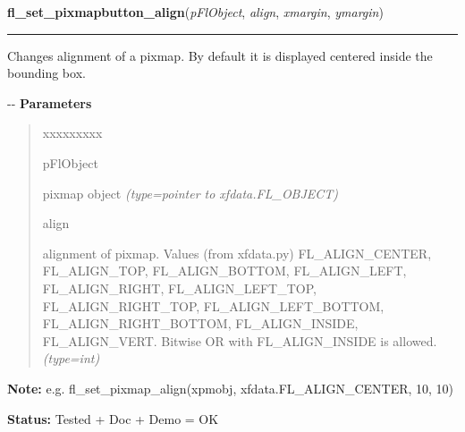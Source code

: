 \hspace{.8\funcindent}\begin{boxedminipage}{\funcwidth}

    \raggedright \textbf{fl\_set\_pixmapbutton\_align}(\textit{pFlObject}, \textit{align}, \textit{xmargin}, \textit{ymargin})

    \vspace{-1.5ex}

    \rule{\textwidth}{0.5\fboxrule}
\setlength{\parskip}{2ex}

Changes alignment of a pixmap. By default it is displayed centered
inside the bounding box.

-{}-
\setlength{\parskip}{1ex}
      \textbf{Parameters}
      \vspace{-1ex}

      \begin{quote}
        \begin{Ventry}{xxxxxxxxx}

          \item[pFlObject]


pixmap object
            {\it (type=pointer to xfdata.FL\_OBJECT)}

          \item[align]


alignment of pixmap. Values (from xfdata.py) FL\_ALIGN\_CENTER,
FL\_ALIGN\_TOP, FL\_ALIGN\_BOTTOM, FL\_ALIGN\_LEFT, FL\_ALIGN\_RIGHT,
FL\_ALIGN\_LEFT\_TOP, FL\_ALIGN\_RIGHT\_TOP, FL\_ALIGN\_LEFT\_BOTTOM,
FL\_ALIGN\_RIGHT\_BOTTOM, FL\_ALIGN\_INSIDE, FL\_ALIGN\_VERT.
Bitwise OR with FL\_ALIGN\_INSIDE is allowed.
            {\it (type=int)}

        \end{Ventry}

      \end{quote}

\textbf{Note:} 
e.g. fl\_set\_pixmap\_align(xpmobj, xfdata.FL\_ALIGN\_CENTER, 10, 10)


\textbf{Status:} 
Tested + Doc + Demo = OK


    \end{boxedminipage}

    \label{xformslib:flbitmap:fl_set_pixmap_pixmap}

    \vspace{0.5ex}

